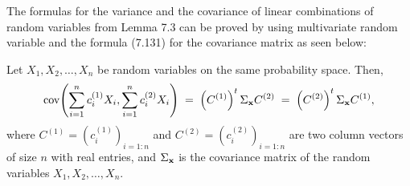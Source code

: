 The formulas for the variance and the covariance of linear combinations of random
variables from Lemma 7.3 can be proved by using multivariate random variable and the
formula (7.131) for the covariance matrix as seen below:

\begin{lemma}
Let $X_1, X_2, \ldots, X_n$ be random variables on the same probability space. Then,
\begin{equation}
\operatorname{cov}\!\left(\sum_{i=1}^n c_i^{(1)}X_i, \sum_{i=1}^n c_i^{(2)}X_i\right) \;=\;
\left(C^{(1)}\right)^t\Sigma_{\mathbf{x}}C^{(2)} \;=\; \left(C^{(2)}\right)^t\Sigma_{\mathbf{x}}C^{(1)},
\end{equation}
where $C^{(1)} = \left(c_i^{(1)}\right)_{i=1:n}$ and $C^{(2)} =
\left(c_i^{(2)}\right)_{i=1:n}$ are two column vectors of size $n$ with real entries,
and $\Sigma_{\mathbf{x}}$ is the covariance matrix of the random variables $X_1, X_2, \ldots,
X_n$.
\end{lemma}

